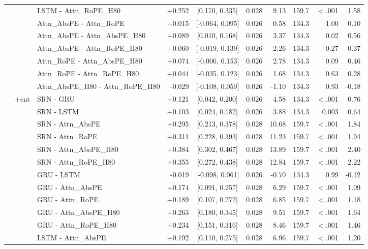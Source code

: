 \begin{longtable}{@{}lllrcrrrrr@{}}
 &  & LSTM - Attn\_RoPE\_H80 & +0.252 & [0.170, 0.335] & 0.028 & 9.13 & 159.7 & $<$.001 & 1.58 \\
 &  & Attn\_AbsPE - Attn\_RoPE & +0.015 & [-0.064, 0.095] & 0.026 & 0.58 & 134.3 & 1.00 & 0.10 \\
 &  & Attn\_AbsPE - Attn\_AbsPE\_H80 & +0.089 & [0.010, 0.168] & 0.026 & 3.37 & 134.3 & 0.02 & 0.56 \\
 &  & Attn\_AbsPE - Attn\_RoPE\_H80 & +0.060 & [-0.019, 0.139] & 0.026 & 2.26 & 134.3 & 0.27 & 0.37 \\
 &  & Attn\_RoPE - Attn\_AbsPE\_H80 & +0.074 & [-0.006, 0.153] & 0.026 & 2.78 & 134.3 & 0.09 & 0.46 \\
 &  & Attn\_RoPE - Attn\_RoPE\_H80 & +0.044 & [-0.035, 0.123] & 0.026 & 1.68 & 134.3 & 0.63 & 0.28 \\
 &  & Attn\_AbsPE\_H80 - Attn\_RoPE\_H80 & -0.029 & [-0.108, 0.050] & 0.026 & -1.10 & 134.3 & 0.93 & -0.18 \\
\addlinespace[2pt]
 & $+$ent & SRN - GRU & +0.121 & [0.042, 0.200] & 0.026 & 4.58 & 134.3 & $<$.001 & 0.76 \\
 &  & SRN - LSTM & +0.103 & [0.024, 0.182] & 0.026 & 3.88 & 134.3 & 0.003 & 0.64 \\
 &  & SRN - Attn\_AbsPE & +0.295 & [0.213, 0.378] & 0.028 & 10.68 & 159.7 & $<$.001 & 1.84 \\
 &  & SRN - Attn\_RoPE & +0.311 & [0.228, 0.393] & 0.028 & 11.23 & 159.7 & $<$.001 & 1.94 \\
 &  & SRN - Attn\_AbsPE\_H80 & +0.384 & [0.302, 0.467] & 0.028 & 13.89 & 159.7 & $<$.001 & 2.40 \\
 &  & SRN - Attn\_RoPE\_H80 & +0.355 & [0.272, 0.438] & 0.028 & 12.84 & 159.7 & $<$.001 & 2.22 \\
 &  & GRU - LSTM & -0.019 & [-0.098, 0.061] & 0.026 & -0.70 & 134.3 & 0.99 & -0.12 \\
 &  & GRU - Attn\_AbsPE & +0.174 & [0.091, 0.257] & 0.028 & 6.29 & 159.7 & $<$.001 & 1.09 \\
 &  & GRU - Attn\_RoPE & +0.189 & [0.107, 0.272] & 0.028 & 6.85 & 159.7 & $<$.001 & 1.18 \\
 &  & GRU - Attn\_AbsPE\_H80 & +0.263 & [0.180, 0.345] & 0.028 & 9.51 & 159.7 & $<$.001 & 1.64 \\
 &  & GRU - Attn\_RoPE\_H80 & +0.234 & [0.151, 0.316] & 0.028 & 8.46 & 159.7 & $<$.001 & 1.46 \\
 &  & LSTM - Attn\_AbsPE & +0.192 & [0.110, 0.275] & 0.028 & 6.96 & 159.7 & $<$.001 & 1.20 \\

\end{longtable}

